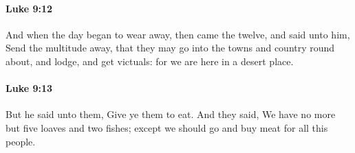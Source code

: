 		\paragraph{Luke 9:12} %
			\label{LUKE-9-12}

			And when the day began to wear away, then came the twelve, and said unto him, Send the multitude away, that they may go into the towns and country round about, and lodge, and get victuals: for we are here in a desert place.

			\begin{framed}
			\scriptsize
				\begin{compactdesc}
					\item[SBLG] 
				\end{compactdesc}
			\end{framed}

		\paragraph{Luke 9:13} %
			\label{LUKE-9-13}

			But he said unto them, Give ye them to eat. And they said, We have no more but five loaves and two fishes; except we should go and buy meat for all this people.

